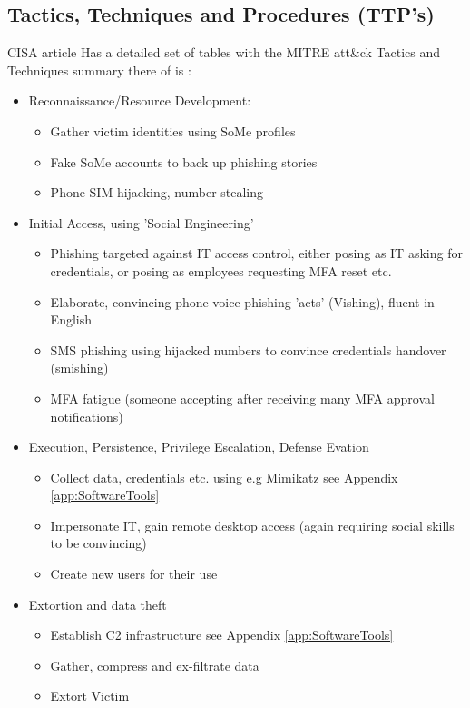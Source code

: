 \documentclass[
	letterpaper, %
	10pt, %
	unnumberedsections, %
	twoside, %
]{APAAssignment}
\begin{document}
\subsection{Tactics, Techniques and Procedures (TTP's)}
CISA article \cite{CISA_ScattetedSpider} Has a detailed set of tables with the MITRE att\&ck Tactics and Techniques summary there of is :
\begin{itemize}
	\item Reconnaissance/Resource Development:
	      \begin{itemize}
		      \item Gather victim identities using SoMe profiles
		      \item Fake SoMe accounts to back up phishing stories
		      \item Phone SIM hijacking, number stealing
	      \end{itemize}
	\item Initial Access, using 'Social Engineering'
	      \begin{itemize}
		      \item Phishing targeted against IT access control, either posing as IT asking for credentials, or posing as employees requesting MFA reset etc.
		      \item Elaborate, convincing phone voice phishing 'acts' (Vishing), fluent in English
		      \item SMS phishing using hijacked numbers to convince credentials handover (smishing)
		      \item MFA fatigue (someone accepting after receiving many MFA approval notifications)
	      \end{itemize}
	\item Execution, Persistence, Privilege Escalation, Defense Evation
	      \begin{itemize}
		      \item Collect data, credentials etc. using e.g Mimikatz see Appendix \ref{app:SoftwareTools}
		      \item Impersonate IT, gain remote desktop access (again requiring social skills to be convincing)
		      \item Create new users for their use
	      \end{itemize}
	\item Extortion and data theft
	      \begin{itemize}
		      \item Establish C2 infrastructure see Appendix \ref{app:SoftwareTools}
		      \item Gather, compress and ex-filtrate data
		      \item Extort Victim
	      \end{itemize}
\end{itemize}
\end{document}
